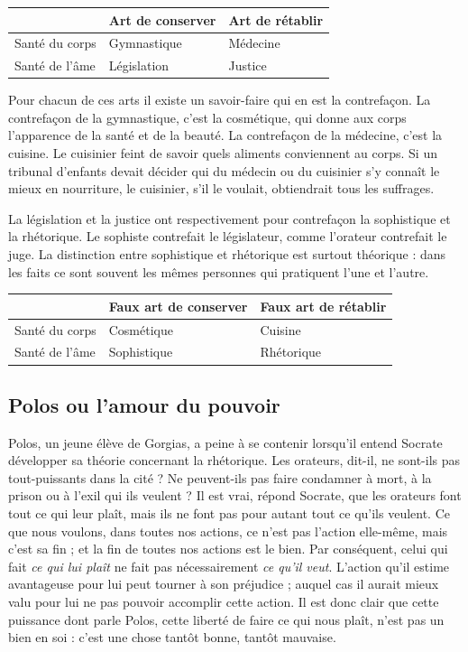 \documentclass[a5paper,12pt]{article}
\begin{document}
\begin{longtable}[]{@{}lll@{}}
\toprule()
& Art de conserver & Art de rétablir \\
\midrule()
\endhead Santé du corps & Gymnastique & Médecine \\
Santé de l'âme & Législation & Justice \\
\bottomrule()
\end{longtable}

Pour chacun de ces arts il existe un savoir-faire qui en est la contrefaçon. La contrefaçon de la gymnastique, c'est la cosmétique, qui donne aux corps l'apparence de la santé et de la beauté. La contrefaçon de la médecine, c'est la cuisine. Le cuisinier feint de savoir quels aliments conviennent au corps. Si un tribunal d'enfants devait décider qui du médecin ou du cuisinier s'y connaît le mieux en nourriture, le cuisinier, s'il le voulait, obtiendrait tous les suffrages.

La législation et la justice ont respectivement pour contrefaçon la sophistique et la rhétorique. Le sophiste contrefait le législateur, comme l'orateur contrefait le juge. La distinction entre sophistique et rhétorique est surtout théorique : dans les faits ce sont souvent les mêmes personnes qui pratiquent l'une et l'autre.

\begin{longtable}[]{@{}lll@{}}
\toprule()
& Faux art de conserver & Faux art de rétablir \\
\midrule()
\endhead Santé du corps & Cosmétique & Cuisine \\
Santé de l'âme & Sophistique & Rhétorique \\
\bottomrule()
\end{longtable}

\subsection*{Polos ou l'amour du pouvoir}

Polos, un jeune élève de Gorgias, a peine à se contenir lorsqu'il entend Socrate développer sa théorie concernant la rhétorique. Les orateurs, dit-il, ne sont-ils pas tout-puissants dans la cité ? Ne peuvent-ils pas faire condamner à mort, à la prison ou à l'exil qui ils veulent ? Il est vrai, répond Socrate, que les orateurs font tout ce qui leur plaît, mais ils ne font pas pour autant tout ce qu'ils veulent. Ce que nous voulons, dans toutes nos actions, ce n'est pas l'action elle-même, mais c'est sa fin ; et la fin de toutes nos actions est le bien. Par conséquent, celui qui fait \emph{ce qui lui plaît} ne fait pas nécessairement \emph{ce qu'il veut}. L'action qu'il estime avantageuse pour lui peut tourner à son préjudice ; auquel cas il aurait mieux valu pour lui ne pas pouvoir accomplir cette action. Il est donc clair que cette puissance dont parle Polos, cette liberté de faire ce qui nous plaît, n'est pas un bien en soi : c'est une chose tantôt bonne, tantôt mauvaise.
\end{document}
